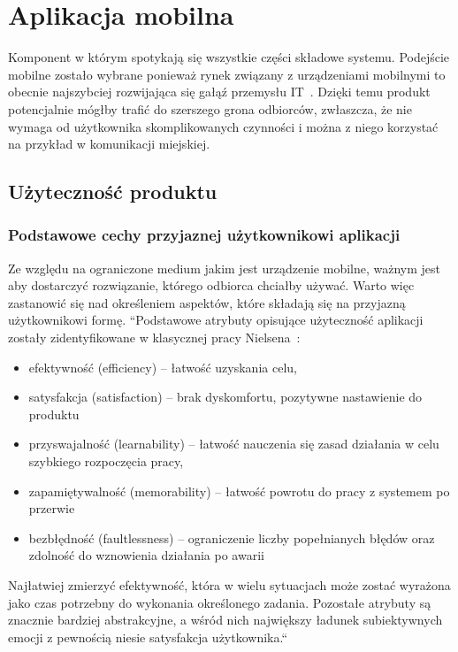 \section{Aplikacja mobilna}
Komponent w którym spotykają się wszystkie części składowe systemu. Podejście mobilne zostało wybrane ponieważ rynek związany z urządzeniami mobilnymi to obecnie najszybciej rozwijająca się gałąź przemysłu IT~\cite{mobile}. Dzięki temu produkt potencjalnie mógłby trafić do szerszego grona odbiorców, zwłaszcza, że nie wymaga od użytkownika skomplikowanych czynności i można z niego korzystać na przykład w komunikacji miejskiej.

\subsection{Użyteczność produktu}
\subsubsection{Podstawowe cechy przyjaznej użytkownikowi aplikacji}
 Ze względu na ograniczone medium jakim jest urządzenie mobilne, ważnym jest aby dostarczyć rozwiązanie, którego odbiorca chciałby używać. Warto więc zastanowić się nad określeniem aspektów, które składają się na przyjazną użytkownikowi formę.
 ``Podstawowe atrybuty opisujące użyteczność aplikacji zostały zidentyfikowane w klasycznej pracy Nielsena~\cite{usability}: 
 \begin{itemize}
	 \item efektywność (efficiency) – łatwość uzyskania celu,
	 \item satysfakcja (satisfaction) – brak dyskomfortu, pozytywne nastawienie do
	 produktu
	 \item przyswajalność (learnability) – łatwość nauczenia się zasad działania w celu szybkiego rozpoczęcia pracy,
	 \item zapamiętywalność (memorability) – łatwość powrotu do pracy z systemem
	 po przerwie
	 \item bezbłędność (faultlessness) – ograniczenie liczby popełnianych błędów oraz zdolność do wznowienia działania po awarii
 \end{itemize}
 Najłatwiej zmierzyć efektywność, która w wielu sytuacjach może zostać
 wyrażona jako czas potrzebny do wykonania określonego zadania. Pozostałe
 atrybuty są znacznie bardziej abstrakcyjne, a wśród nich największy ładunek
 subiektywnych emocji z pewnością niesie satysfakcja użytkownika.``~\cite{mobile}

